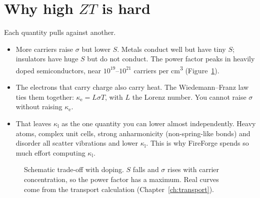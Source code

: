 \documentclass[11pt,a4paper]{report}
\newcommand{\kl}{\kappa_\mathrm{l}}
\newcommand{\ke}{\kappa_\mathrm{e}}
\begin{document}
\section{Why high $ZT$ is hard}

Each quantity pulls against another.

\begin{itemize}
\item More carriers raise $\sigma$ but lower $S$. Metals conduct well but have tiny $S$;
  insulators have huge $S$ but do not conduct. The power factor peaks in heavily doped
  semiconductors, near $10^{19}$--$10^{21}$ carriers per \si{\centi\metre\cubed}
  (Figure~\ref{fig:tradeoff}).
\item The electrons that carry charge also carry heat. The Wiedemann--Franz law ties them
  together: $\ke = L\sigma T$, with $L$ the Lorenz number. You cannot raise $\sigma$ without
  raising $\ke$.
\item That leaves $\kl$ as the one quantity you can lower almost independently. Heavy atoms,
  complex unit cells, strong anharmonicity (non-spring-like bonds) and disorder all scatter
  vibrations and lower $\kl$. This is why FireForge spends so much effort computing $\kl$.
\end{itemize}

\begin{figure}[h]
\centering
{}
\caption{Schematic trade-off with doping. $S$ falls and $\sigma$ rises with carrier
concentration, so the power factor has a maximum. Real curves come from the transport
calculation (Chapter~\ref{ch:transport}).}
\label{fig:tradeoff}
\end{figure}
\end{document}
